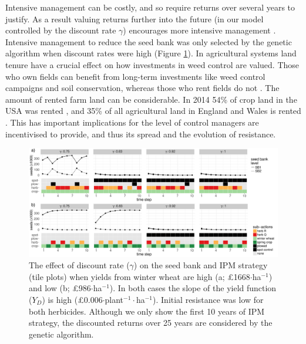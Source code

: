 \documentclass[12pt, a4paper]{article}
\begin{document}
Intensive management can be costly, and so require returns over several years to justify. As a result valuing returns further into the future (in our model controlled by the discount rate $\gamma$) encourages more intensive management \citep{EpanN2010}. Intensive management to reduce the seed bank was only selected by the genetic algorithm when discount rates were high (Figure \ref{fig:dis_rate}). In agricultural systems land tenure have a crucial effect on how investments in weed control are valued. Those who own fields can benefit from long-term investments like weed control campaigns and soil conservation, whereas those who rent fields do not \citep{Wies1996, Fras2004}. The amount of rented farm land can be considerable. In 2014  54\% of crop land in the USA was rented \citep{Bige2016}, and 35\% of all agricultural land in England and Wales is rented \citep{CAAV2017}. This has important implications for the level of control managers are incentivised to provide, and thus its spread and the evolution of resistance.       
\begin{figure}
	\includegraphics[width=178mm]{MS_figs/dis_rate_SB_strat.pdf}
	\caption{The effect of discount rate ($\gamma$) on the seed bank and IPM strategy (tile plots) when yields from winter wheat are high (a; \pounds 1668$\cdot$ha$^{-1}$) and low (b; \pounds 986$\cdot$ha$^{-1}$). In both cases the slope of the yield function ($Y_D$) is high (\pounds 0.006$\cdot$plant$^{-1}\cdot$ha$^{-1}$). Initial resistance was low for both herbicides. Although we only show the first 10 years of IPM strategy, the discounted returns over 25 years are considered by the genetic algorithm.}
	\label{fig:dis_rate} 
\end{figure}
\end{document}
